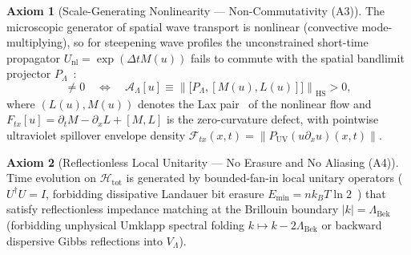 \documentclass[11pt,a4paper]{article}
\theoremstyle{definition}
\newtheorem{axiom}{Axiom}[section]
\begin{document}
\begin{axiom}[Scale-Generating Nonlinearity --- Non-Commutativity (A3)]
\label{ax:a3}
The microscopic generator of spatial wave transport is nonlinear (convective mode-multiplying), so for steepening wave profiles the unconstrained short-time propagator $U_{\text{nl}} = \exp(\Delta t M(u))$ fails to commute with the spatial bandlimit projector $P_{\Lambda}$~\cite{lax1968}:
\begin{equation}
[P_{\Lambda}, U_{\text{nl}}] \ne 0 \quad \Longleftrightarrow \quad \mathcal{A}_{\Lambda}[u] \equiv \left\| \big[ P_{\Lambda}, [M(u), L(u)] \big] \right\|_{\text{HS}} > 0,
\end{equation}
where $(L(u), M(u))$ denotes the Lax pair~\cite{lax1968} of the nonlinear flow and $F_{tx}[u] = \partial_t M - \partial_x L + [M, L]$ is the zero-curvature defect, with pointwise ultraviolet spillover envelope density $\mathcal{F}_{tx}(x,t) = \|P_{\text{UV}}(u\partial_x u)(x,t)\|$.
\end{axiom}
\begin{axiom}[Reflectionless Local Unitarity --- No Erasure and No Aliasing (A4)]
\label{ax:a4}
Time evolution on $\mathcal{H}_{\text{tot}}$ is generated by bounded-fan-in local unitary operators ($U^\dagger U = I$, forbidding dissipative Landauer bit erasure $E_{\min} = n k_B T \ln 2$~\cite{landauer1961,bennett1973}) that satisfy reflectionless impedance matching at the Brillouin boundary $|k| = \Lambda_{\text{Bek}}$ (forbidding unphysical Umklapp spectral folding $k \mapsto k - 2\Lambda_{\text{Bek}}$ or backward dispersive Gibbs reflections into $V_{\Lambda}$).
\end{axiom}
\end{document}
